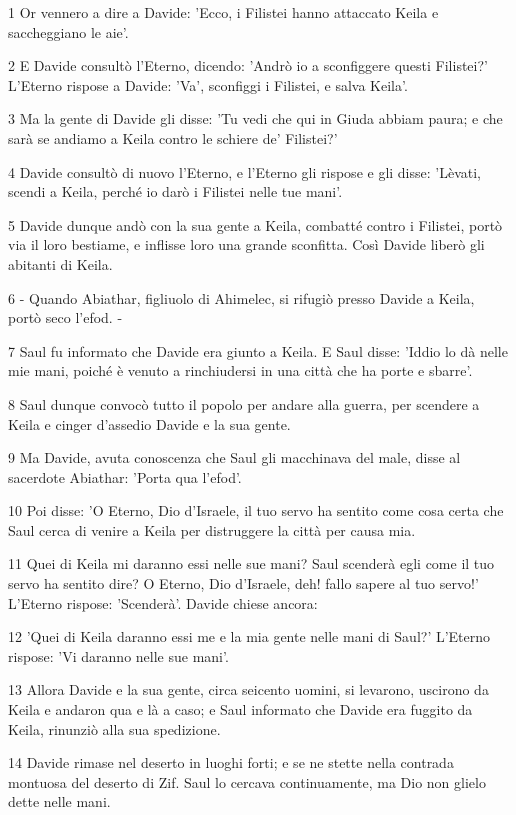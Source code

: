 \par 1 Or vennero a dire a Davide: 'Ecco, i Filistei hanno attaccato Keila e saccheggiano le aie'.
\par 2 E Davide consultò l'Eterno, dicendo: 'Andrò io a sconfiggere questi Filistei?' L'Eterno rispose a Davide: 'Va', sconfiggi i Filistei, e salva Keila'.
\par 3 Ma la gente di Davide gli disse: 'Tu vedi che qui in Giuda abbiam paura; e che sarà se andiamo a Keila contro le schiere de' Filistei?'
\par 4 Davide consultò di nuovo l'Eterno, e l'Eterno gli rispose e gli disse: 'Lèvati, scendi a Keila, perché io darò i Filistei nelle tue mani'.
\par 5 Davide dunque andò con la sua gente a Keila, combatté contro i Filistei, portò via il loro bestiame, e inflisse loro una grande sconfitta. Così Davide liberò gli abitanti di Keila.
\par 6 - Quando Abiathar, figliuolo di Ahimelec, si rifugiò presso Davide a Keila, portò seco l'efod. -
\par 7 Saul fu informato che Davide era giunto a Keila. E Saul disse: 'Iddio lo dà nelle mie mani, poiché è venuto a rinchiudersi in una città che ha porte e sbarre'.
\par 8 Saul dunque convocò tutto il popolo per andare alla guerra, per scendere a Keila e cinger d'assedio Davide e la sua gente.
\par 9 Ma Davide, avuta conoscenza che Saul gli macchinava del male, disse al sacerdote Abiathar: 'Porta qua l'efod'.
\par 10 Poi disse: 'O Eterno, Dio d'Israele, il tuo servo ha sentito come cosa certa che Saul cerca di venire a Keila per distruggere la città per causa mia.
\par 11 Quei di Keila mi daranno essi nelle sue mani? Saul scenderà egli come il tuo servo ha sentito dire? O Eterno, Dio d'Israele, deh! fallo sapere al tuo servo!' L'Eterno rispose: 'Scenderà'. Davide chiese ancora:
\par 12 'Quei di Keila daranno essi me e la mia gente nelle mani di Saul?' L'Eterno rispose: 'Vi daranno nelle sue mani'.
\par 13 Allora Davide e la sua gente, circa seicento uomini, si levarono, uscirono da Keila e andaron qua e là a caso; e Saul informato che Davide era fuggito da Keila, rinunziò alla sua spedizione.
\par 14 Davide rimase nel deserto in luoghi forti; e se ne stette nella contrada montuosa del deserto di Zif. Saul lo cercava continuamente, ma Dio non glielo dette nelle mani.
